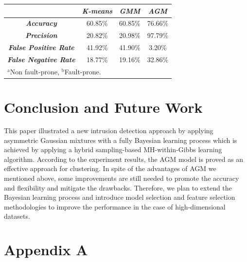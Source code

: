 \documentclass[conference]{IEEEtran}
\begin{document}
\begin{table}
\begin{center}
\begin{tabular}{|c|c|c|c|}
\hline
& \multicolumn{1}{|p{2.5cm}|}{\centering \textbf{\textit{K-means}}} & \multicolumn{1}{|p{2.5cm}|}{\centering \textbf{\textit{GMM}}} & \multicolumn{1}{|p{2.5cm}|}{\centering \textbf{\textit{AGM}}}\\
\hline
\multicolumn{1}{|p{3.5cm}|}{\centering \textbf{\textit{Accuracy}}} & 60.85\% & 60.85\% & 76.66\%\\
\multicolumn{1}{|p{3.5cm}|}{\centering \textbf{\textit{Precision}}} & 20.82\% & 20.98\% & 97.79\%\\
\multicolumn{1}{|p{3.5cm}|}{\centering \textbf{\textit{False Positive Rate}}} & 41.92\% & 41.90\% & 3.20\%\\
\multicolumn{1}{|p{3.5cm}|}{\centering \textbf{\textit{False Negative Rate}}} & 18.77\% & 19.16\% & 32.86\%\\
\hline
\multicolumn{3}{l}{$^{\mathrm{a}}$Non fault-prone, $^{\mathrm{b}}$Fault-prone.}
\end{tabular}
\end{center}
\label{tab4}
\end{table}

\section{Conclusion and Future Work}
This paper illustrated a new intrusion detection approach by applying asymmetric Gaussian mixtures with a fully Bayesian learning process which is achieved by applying a hybrid sampling-based MH-within-Gibbs learning algorithm. According to the experiment results, the AGM model is proved as an effective approach for clustering.
In spite of the advantages of AGM we mentioned above, some improvements are still needed to promote the accuracy and flexibility and mitigate the drawbacks. Therefore, we plan to extend the Bayesian learning process and introduce model selection and feature selection methodologies to improve the performance in the case of high-dimensional datasets.

\section*{Appendix A}
\end{document}
